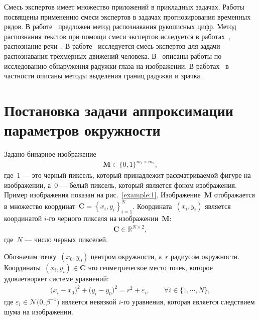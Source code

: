 \documentclass[12pt, twoside]{article}
\numberwithin{equation}{section}
\begin{document}
Смесь экспертов имеет множество приложений в прикладных задачах. Работы~\cite{Yumlu2003, Cheung1995, Weigend2000} посвящены применению смеси экспертов в задачах прогнозирования временных рядов. 
В работе~\cite{Ebrahimpour2009} предложен метод распознавания рукописных цифр. 
Метод распознания текстов при помощи смеси экспертов иследуется в работах~\cite{Estabrooks2001}, распознание речи~\cite{Mossavat2010, Peng1996, Tuerk2001}. 
В работе~\cite{Sminchisescu2007} исследуется смесь экспертов для задачи распознавания трехмерных движений человека. 
В~\cite{Bowyer2010} описаны работы по исследованию обнаружения радужки глаза на изображении. В работах~\cite{Matveev2010, Matveev2014} в частности описаны методы выделения границ радужки и зрачка.

\section{Постановка задачи аппроксимации параметров окружности}
Задано бинарное изображение
\[
\label{eq:st:cr:1}
\begin{aligned}
\textbf{M} \in \{0,1\}^{m_1 \times m_2},
\end{aligned}
\]
где~$1$ --- это черный пиксель, который принадлежит рассматриваемой фигуре на изображении, а~$0$ --- белый пиксель, который является фоном изображения. 
Пример изображения показан на рис.~\ref{example:1}.
Изображение~$\textbf{M}$ отображается в множество координат~\mbox{$\textbf{C}=\left\{x_i, y_i\right\}_{i=1}^{N}$}. Координата~$(x_i, y_i)$ является координатой $i$-го черного пикселя на изображении~$\textbf{M}$:
\[
\label{eq:st:cr:2}
\begin{aligned}
\textbf{C} \in  \mathbb{R}^{N \times 2},
\end{aligned}
\]
где~$N$ --- число черных пикселей.

Обозначим точку~$(x_0, y_0)$ центром окружности, а~$r$ радиусом окружности.
Координаты~$\left(x_i, y_i\right)\in\textbf{C}$ это геометрическое место точек, которое удовлетворяет системе уравнений:
\[
\label{eq:st:cr:3}
\begin{aligned}
\bigr(x_i - x_0\bigr)^{2}+\bigr(y_i-y_0\bigr)^2 = r^2 + \varepsilon_i, \qquad \forall i \in \{1, \cdots, N\},
\end{aligned}
\]
где $\varepsilon_i \in \mathcal{N}\bigr(0, \beta^{-1}\bigr)$ является невязкой $i$-го уравнения, которая является следствием шума на изображении.
\end{document}
